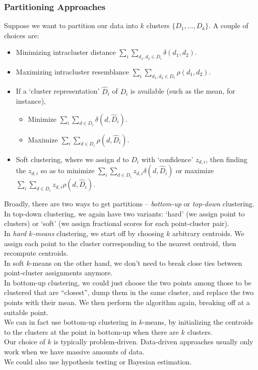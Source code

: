 \documentclass{article}
\begin{document}

		\subsubsection{Partitioning Approaches}

			Suppose we want to partition our data into $k$ clusters $\{D_1,\ldots,D_k\}$. A couple of choices are:
			\begin{itemize}
				\item Minimizing intracluster distance $\sum_i \sum_{d_1,d_2 \in D_i} \delta(d_1,d_2)$.
				\item Maximizing intracluster resemblance $\sum_i \sum_{d_1,d_2 \in D_i} \rho(d_1,d_2)$.
				\item If a `cluster representation' $\hat{D}_i$ of $D_i$ is available (such as the mean, for instance),
				\begin{itemize}
					\item Minimize $\sum_i \sum_{d \in D_i} \delta(d,\hat{D}_i)$.
					\item Maximize $\sum_i \sum_{d\in D_i} \rho(d,\hat{D}_i)$.
				\end{itemize}
				\item Soft clustering, where we assign $d$ to $D_i$ with `confidence' $z_{d,i}$, then finding the $z_{d,i}$ so as to minimize $\sum_{i} \sum_{d\in D_i} z_{d,i} \delta(d,\hat{D}_i)$ or maximize $\sum_i \sum_{d\in D_i} z_{d,i} \rho(d,\hat{D}_i)$.
			\end{itemize}

			Broadly, there are two ways to get partitions -- \emph{bottom-up} or \emph{top-down} clustering.\\

			In top-down clustering, we again have two variants: `hard' (we assign point to clusters) or `soft' (we assign fractional scores for each point-cluster pair).\\
			In \emph{hard $k$-means} clustering, we start off by choosing $k$ arbitrary centroids. We assign each point to the cluster corresponding to the nearest centroid, then recompute centroids.\\
			In soft $k$-means on the other hand, we don't need to break close ties between point-cluster assignments anymore.\\

			In bottom-up clustering, we could just choose the two points among those to be clustered that are ``closest'', dump them in the same cluster, and replace the two points with their mean. We then perform the algorithm again, breaking off at a suitable point.\\

			We can in fact use bottom-up clustering in $k$-means, by initializing the centroids to the clusters at the point in bottom-up when there are $k$ clusters.\\

			Our choice of $k$ is typically problem-driven. Data-driven approaches usually only work when we have massive amounts of data.\\
			We could also use hypothesis testing or Bayesian estimation.
\end{document}
